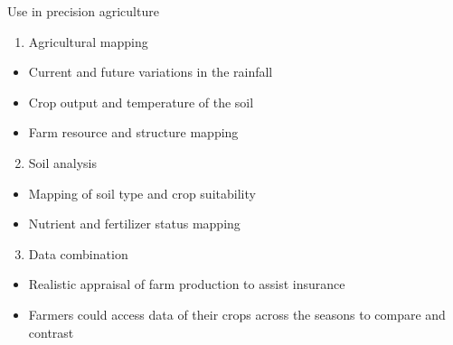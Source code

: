 \documentclass[11pt,dvipsnames,ignorenonframetext,aspectratio=169]{beamer}
\providecommand{\tightlist}{%
  \setlength{\itemsep}{0pt}\setlength{\parskip}{0pt}}
\begin{document}
\begin{frame}{Use in precision agriculture}
\protect\hypertarget{use-in-precision-agriculture}{}
\begin{enumerate}
\tightlist
\item
  Agricultural mapping
\end{enumerate}

\begin{itemize}
\tightlist
\item
  Current and future variations in the rainfall
\item
  Crop output and temperature of the soil
\item
  Farm resource and structure mapping
\end{itemize}

\begin{enumerate}
\setcounter{enumi}{1}
\tightlist
\item
  Soil analysis
\end{enumerate}

\begin{itemize}
\tightlist
\item
  Mapping of soil type and crop suitability
\item
  Nutrient and fertilizer status mapping
\end{itemize}

\begin{enumerate}
\setcounter{enumi}{2}
\tightlist
\item
  Data combination
\end{enumerate}

\begin{itemize}
\tightlist
\item
  Realistic appraisal of farm production to assist insurance
\item
  Farmers could access data of their crops across the seasons to compare
  and contrast
\end{itemize}
\end{frame}
\end{document}
